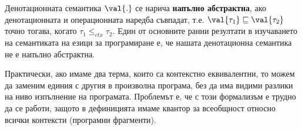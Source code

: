 

\begin{framed}
  Денотационната семантика $\val{.}$ се нарича {\bf напълно абстрактна}, ако денотационната и операционната наредба съвпадат, т.е. $\val{\tau_1} \sqsubseteq \val{\tau_2}$ точно тогава, когато
  $\tau_1 \leq_{ctx} \tau_2$.  Един от основните ранни резултати в изучаването на семантиката на езици за програмиране е, че нашата денотационна семантика не е напълно абстрактна.
\end{framed}

Практически, ако имаме два терма, които са контекстно еквивалентни, то можем да заменим единия с другия в произволна програма,
без да има видими разлики на ниво изпълнение на програмата.
Проблемът е, че с този формализъм е трудно да се работи, защото в дефиницията имаме квантор
за всеобщност относно всички контексти (програмни фрагменти).

